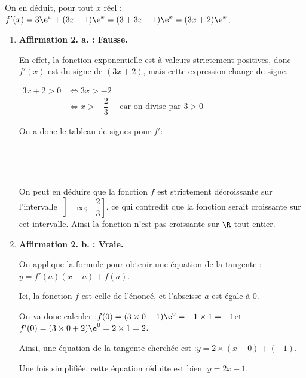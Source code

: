\begin{enumerate}
On en déduit, pour tout $x$ réel :\quad $f'(x) = 3\e^{x} + (3x - 1)\e^{x} = (3 + 3x - 1)\e^{x} = (3x + 2)\e^{x}$.

\begin{enumerate}
\item \textbf{Affirmation 2. a. : Fausse.}

En effet, la fonction exponentielle est à valeurs strictement positives, donc $f'(x)$ est du signe de $(3x + 2)$, mais cette expression change de signe.

$\begin{aligned}
3x + 2 > 0 &\iff 3x > -2\\
			&\iff x > -\dfrac{2}{3} \quad \text{ car on divise par }3>0
\end{aligned}$

On a donc le tableau de signes pour $f'$:

\hfill~\hfill~

On peut en déduire que la fonction $f$ est strictement décroissante sur l'intervalle $\left]-\infty ; -\dfrac{2}{3}\right] $, ce qui contredit que la fonction serait croissante sur cet intervalle. Ainsi la fonction n'est pas croissante sur $\R$ tout entier.

\item \textbf{Affirmation 2. b. : Vraie.}

On applique la formule pour obtenir une équation de la tangente :\quad $y = f'(a) (x - a) + f(a)$.

Ici, la fonction $f$ est celle de l'énoncé, et l'abscisse $a$ est égale à 0.

On va donc calculer :\quad $f(0) = (3\times 0 - 1)\e^{0} = -1 \times 1 = -1$\quad et \quad $f'(0) = (3\times 0 + 2)\e^{0} = 2\times 1 = 2$.

Ainsi, une équation de la tangente cherchée est :\quad $y = 2 \times (x - 0) + (-1)$.

Une fois simplifiée, cette équation réduite est bien :\quad $y = 2x - 1$.
	\end{enumerate}
\end{enumerate}
